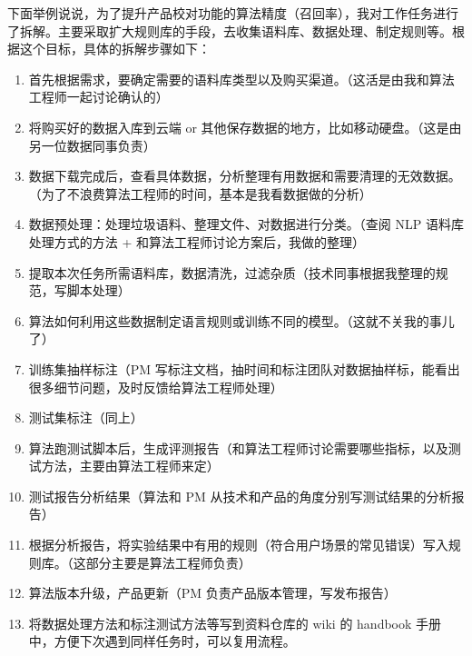 \documentclass[letterpaper,11pt,english]{sphinxmanual}
\begin{document}
下面举例说说，为了提升产品校对功能的算法精度（召回率），我对工作任务进行了拆解。主要采取扩大规则库的手段，去收集语料库、数据处理、制定规则等。根据这个目标，具体的拆解步骤如下：
\begin{enumerate}
%
\item {} 
首先根据需求，要确定需要的语料库类型以及购买渠道。（这活是由我和算法工程师一起讨论确认的）

\item {} 
将购买好的数据入库到云端 or
其他保存数据的地方，比如移动硬盘。（这是由另一位数据同事负责）

\item {} 
数据下载完成后，查看具体数据，分析整理有用数据和需要清理的无效数据。（为了不浪费算法工程师的时间，基本是我看数据做的分析）

\item {} 
数据预处理：处理垃圾语料、整理文件、对数据进行分类。（查阅 NLP
语料库处理方式的方法 + 和算法工程师讨论方案后，我做的整理）

\item {} 
提取本次任务所需语料库，数据清洗，过滤杂质（技术同事根据我整理的规范，写脚本处理）

\item {} 
算法如何利用这些数据制定语言规则或训练不同的模型。（这就不关我的事儿了）

\item {} 
训练集抽样标注（PM
写标注文档，抽时间和标注团队对数据抽样标，能看出很多细节问题，及时反馈给算法工程师处理）

\item {} 
测试集标注（同上）

\item {} 
算法跑测试脚本后，生成评测报告（和算法工程师讨论需要哪些指标，以及测试方法，主要由算法工程师来定）

\item {} 
测试报告分析结果（算法和 PM
从技术和产品的角度分别写测试结果的分析报告）

\item {} 
根据分析报告，将实验结果中有用的规则（符合用户场景的常见错误）写入规则库。（这部分主要是算法工程师负责）

\item {} 
算法版本升级，产品更新（PM 负责产品版本管理，写发布报告）

\item {} 
将数据处理方法和标注\sphinxhyphen{}测试方法等写到资料仓库的 wiki 的 handbook
手册中，方便下次遇到同样任务时，可以复用流程。

\end{enumerate}
\end{document}
